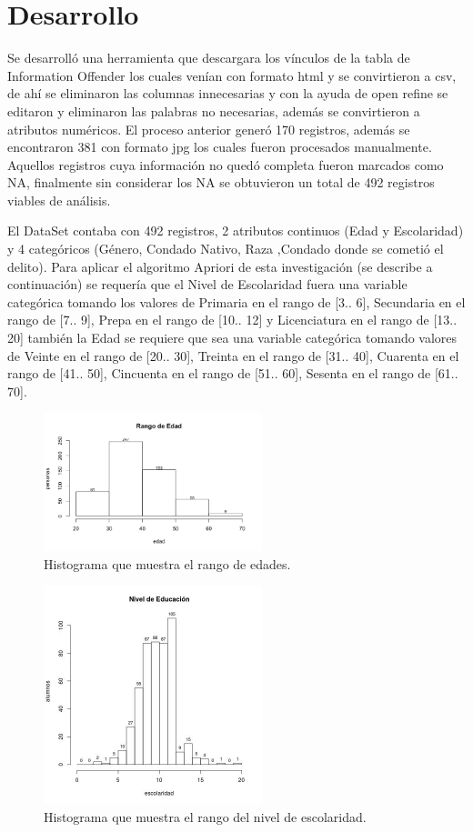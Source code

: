 \documentclass[sigconf]{acmart}
\begin{document}
\section{Desarrollo}
Se desarrolló una herramienta que descargara los vínculos de la tabla de Information Offender los cuales venían con formato html y se convirtieron a csv, de ahí se eliminaron las columnas innecesarias y con la ayuda de open refine se editaron y eliminaron las palabras no necesarias, además se convirtieron a atributos numéricos. El proceso anterior generó 170 registros, además se encontraron 381 con formato jpg los cuales fueron procesados manualmente.
Aquellos registros cuya información no quedó completa fueron marcados como NA, finalmente sin considerar los NA se obtuvieron un total de 492 registros viables de análisis.


El DataSet contaba con 492 registros, 2 atributos continuos (Edad y Escolaridad) y 4 categóricos (Género, Condado Nativo, Raza ,Condado donde se cometió el delito). Para aplicar el algoritmo Apriori de esta investigación (se describe a continuación) se requería que el Nivel de Escolaridad fuera una variable categórica tomando los valores de Primaria en el rango de [3.. 6], Secundaria en el rango de  [7.. 9], Prepa en el rango de  [10.. 12] y Licenciatura en el rango de  [13.. 20] también la Edad se requiere que sea una variable categórica tomando valores de Veinte en el rango de [20.. 30], Treinta en el rango de [31.. 40], Cuarenta en el rango de [41.. 50], Cincuenta en el rango de [51.. 60], Sesenta en el rango de [61.. 70].


\begin{figure}[ht]
  \centering
  \includegraphics[width=2.5in]{Rplot.png}
  \caption{Histograma que muestra el rango de edades.}
\end{figure}

\begin{figure}[ht]
  \centering
  \includegraphics[width=2.5in]{escolaridad.jpg}
  \caption{Histograma que muestra el rango del nivel de  escolaridad.}
\end{figure}
\end{document}
